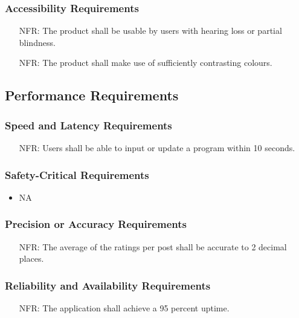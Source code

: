 \documentclass[12pt]{article}
\newcounter{nfrnum} %
\begin{document}
\subsubsection{Accessibility Requirements}
\noindent \begin{itemize}
	\item[NFR\refstepcounter{nfrnum}\thenfrnum:]
	The product shall be usable by users with hearing loss or partial blindness.
\end{itemize}
\noindent \begin{itemize}
	\item[NFR\refstepcounter{nfrnum}\thenfrnum:]
	The product shall make use of sufficiently contrasting colours.
\end{itemize}
\subsection{Performance Requirements}
  \subsubsection{Speed and Latency Requirements}
    \noindent\begin{itemize}
      \item[NFR\refstepcounter{nfrnum}\thenfrnum:] 
        Users shall be able to input or update a program within 10 seconds.
    \end{itemize}
  \subsubsection{Safety-Critical Requirements}
    \noindent\begin{itemize}
      \item NA
    \end{itemize}
  \subsubsection{Precision or Accuracy Requirements}
    \noindent\begin{itemize}
      \item[NFR\refstepcounter{nfrnum}\thenfrnum:] 
        The average of the ratings per post shall be accurate to 2 decimal places.
    \end{itemize}
  \subsubsection{Reliability and Availability Requirements}
    \noindent\begin{itemize}
      \item[NFR\refstepcounter{nfrnum}\thenfrnum:] 
        The application shall achieve a 95 percent uptime.
    \end{itemize}
\end{document}
